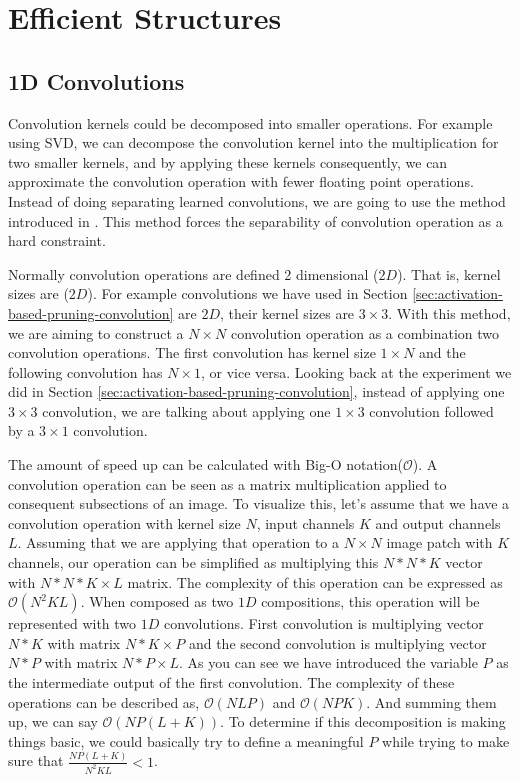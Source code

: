 



\section{Efficient Structures}
\subsection{1D Convolutions}
Convolution kernels could be decomposed into smaller operations. For example using SVD, we can decompose the convolution kernel into the multiplication for two smaller kernels, and by applying these kernels consequently, we can approximate the convolution operation with fewer floating point operations. Instead of doing separating learned convolutions, we are going to use the method introduced in \cite{alvarez2016decomposeme}. This method forces the separability of convolution operation as a hard constraint. 

Normally convolution operations are defined 2 dimensional ($2D$). That is, kernel sizes are ($2D$). For example convolutions we have used in Section \ref{sec:activation-based-pruning-convolution} are $2D$, their kernel sizes are $3 \times 3$. With this method, we are aiming to construct a $N \times N$ convolution operation as a combination two convolution operations. The first convolution has kernel size $1 \times N$ and the following convolution has $N \times 1$, or vice versa. Looking back at the experiment we did in  Section \ref{sec:activation-based-pruning-convolution}, instead of applying one $3 \times 3$ convolution, we are talking about applying one $1 \times 3$ convolution followed by a $3 \times 1$ convolution. 

The amount of speed up can be calculated with Big-O notation($\mathcal{O}$). A convolution operation can be seen as a matrix multiplication applied to consequent subsections of an image. To visualize this, let's assume that we have a convolution operation with kernel size $N$, input channels $K$ and output channels $L$. Assuming that we are applying that operation to a $N \times N$ image patch with $K$ channels, our operation can be simplified as multiplying this $N*N*K$ vector with $N*N*K \times L$ matrix. The complexity of this operation can be expressed as $\mathcal{O}(N^2KL)$. When composed as two $1D$ compositions, this operation will be represented with two $1D$ convolutions. First convolution is multiplying vector $N*K$ with matrix $N*K \times P$ and the second convolution is multiplying vector $N*P$ with matrix $N*P \times L$. As you can see we have introduced the variable $P$ as the intermediate output of the first convolution. The complexity of these operations can be described as, $\mathcal{O}(NLP)$ and $\mathcal{O}(NPK)$. And summing them up, we can say $\mathcal{O}(NP(L + K))$. To determine if this decomposition is making things basic, we could basically try to define a meaningful $P$ while trying to make sure that $\frac{NP(L+K)}{N^2KL} < 1$.


